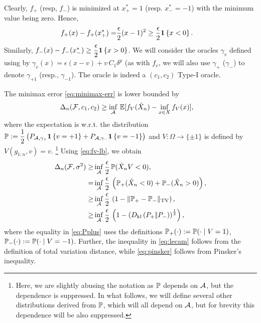 Clearly, $f_+$ (resp, $f_-$) is minimized at $x^*_+ = 1$ (resp. $x^*_- = -1$) with the minimum value being zero.
Hence, 
\begin{align}
  f_+(x) - f_+(x^*_+)
  = &  \dfrac{\epsilon}{2} (x - 1)^2 \ge  \dfrac{\epsilon}{2}  \indic{x  < 0}. \label{eq:fv-lb}
\end{align}
Similarly,   $f_-(x) - f_-(x^*_-) \ge  \dfrac{\epsilon}{2}  \indic{x  >0}$.
We will consider the oracles $\gamma_v$ defined using 
by $\gamma_v(x) = \epsilon(x-v) + v\, C_1 \delta^p$ (as with $f_v$, we will also use $\gamma_{+}$ ($\gamma_-$) 
to denote $\gamma_{+1}$ (resp., $\gamma_{-1}$).
The oracle is indeed a $(c_1,c_2)$ Type-I oracle.

The minimax error \eqref{eq:minimax-err} is lower bounded by
\begin{align}
\MoveEqLeft 
\Delta_n(\F, c_1,c_2) %
  \ge  \inf_{\A} \,  \E[f_V(\hat X_n) - \inf_{x \in X}
  f_V(x)],\label{eq:avg-bd}
  \end{align}
where the expectation is w.r.t. the distribution $\P:= \dfrac{1}{2} \left(P_{\A, \gamma_+} \indic{v=+1} + P_{\A, \gamma_-}\indic{v=-1}\right)$ and $V: \Omega \to \{\pm 1 \}$ is defined by $V(g_{1:n},v) = v$.%
\footnote{Here, we are slightly abusing the notation as $\P$ depends on $\A$, but the dependence is suppressed.
In what follows, we will define several other distributions derived from $\P$, which will all depend on $\A$, but
for brevity this dependence will be also suppressed.}
Using \eqref{eq:fv-lb}, we obtain
\begin{align}
\Delta_n(\F, \sigma^2)  \ge & \inf_{\A} \dfrac{\epsilon}{2}\,  \P(\hat X_n V < 0), \label{eq:strong-convex-bd}\\
  = & \inf_{\A} \dfrac{\epsilon }{2} \, \left(\P_{+}(\hat X_n < 0) + \P_{-}(\hat X_n > 0)\right), \label{eq:Pplus}\\
  \ge &\inf_{\A} \dfrac{\epsilon }{2} \,\left(1 - \tvnorm{\P_{+}- \P_{-}}\right), \label{eq:lecam}\\
  \ge &\inf_{\A} \dfrac{\epsilon }{2}  \,\left( 1 - \left(\dkl{P_{+}}{P_{-}}\right)^{\frac{1}{2}}\right), \label{eq:pinsker}
\end{align}
where 
the equality in \eqref{eq:Pplus} uses the definitions $\P_{+}(\cdot) := \P(\cdot\mid V=1)$, $\P_{-}(\cdot) := \P(\cdot\mid V=-1)$. Further, the inequality in \eqref{eq:lecam} follows from the definition of total variation distance, while \eqref{eq:pinsker} follows from Pinsker's inequality. 


